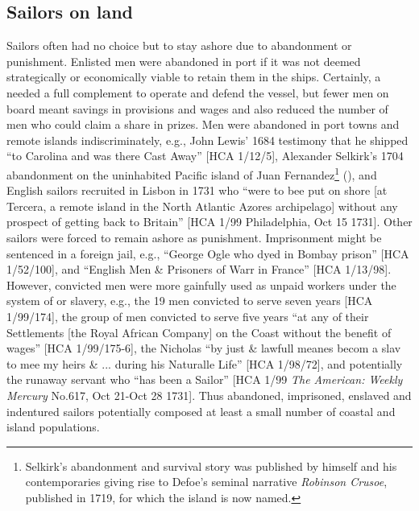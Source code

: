 \subsection{{Sailors on land}}\label{sec:4.3.5}

Sailors often had no choice but to stay ashore due to abandonment or punishment. Enlisted men were abandoned in port if it was not deemed strategically or economically viable to retain them in the ships. Certainly, a  needed a full complement to operate and defend the vessel, but fewer men on board meant savings in provisions and wages and also reduced the number of men who could claim a share in prizes. Men were abandoned in port towns and remote islands indiscriminately, e.g., John Lewis’ 1684 testimony that he shipped “to Carolina and was there Cast Away” [HCA 1/12/5], Alexander Selkirk’s 1704 abandonment on the uninhabited Pacific island of Juan Fernandez\footnote{Selkirk’s abandonment and survival story was published by himself and his contemporaries giving rise to Defoe’s seminal narrative \textit{Robinson Crusoe}, published in 1719, for which the island is now named.}  (\citealt{Souhami2013}), and English sailors recruited in Lisbon in 1731 who “were to bee put on shore [at Tercera, a remote island in the North Atlantic Azores archipelago] without any prospect of getting back to Britain” [HCA 1/99 Philadelphia, Oct 15 1731]. Other sailors were forced to remain ashore as punishment. Imprisonment might be sentenced in a foreign jail, e.g., “George Ogle who dyed in Bombay prison” [HCA 1/52/100], and “English Men \& Prisoners of Warr in France” [HCA 1/13/98]. However, convicted men were more gainfully used as unpaid workers under the system of  or slavery, e.g., the 19 men convicted to serve seven years [HCA 1/99/174], the group of men convicted to serve five years “at any of their Settlements [the Royal African Company] on the Coast without the benefit of wages” [HCA 1/99/175-6], the  Nicholas “by just \& lawfull meanes becom a slav to mee my heirs \& ... during his Naturalle Life” [HCA 1/98/72], and potentially the runaway servant who “has been a Sailor” [HCA 1/99 \textit{The American: Weekly Mercury} No.617, Oct 21-Oct 28 1731]. Thus abandoned, imprisoned, enslaved and indentured sailors potentially composed at least a small number of coastal and island populations. 

